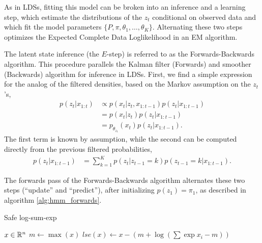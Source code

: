 \documentclass{article}
\begin{document}
As in LDSs, fitting this model can be broken into an inference and a learning
step, which estimate the distributions of the $z_{t}$ conditional on observed
data and which fit the model parameters $\{P, \pi, \theta_{1}, \dots,
\theta_{K}\}$. Alternating these two steps optimizes the Expected Complete Data
Loglikelihood in an EM algorithm.

The latent state inference (the $E$-step) is referred to as the
Forwards-Backwards algorithm. This procedure parallels the Kalman filter
(Forwards) and smoother (Backwards) algorithm for inference in LDSs. First,
we find a simple expression for the analog of the filtered densities, based on
the Markov assumption on the $z_{t}$'s,
\begin{align*}
  p\left(z_{t} \vert x_{1:t}\right) &\propto p\left(x_{t} \vert z_{t}, x_{1:t - 1}\right) p\left(z_{t} \vert x_{1:t - 1}\right) \\
  &= p\left(x_{t} \vert z_{t}\right) p\left(z_{t} \vert x_{1:t - 1}\right) \\
  &= p_{\theta_{z_{t}}}\left(x_{t}\right)p\left(z_{t} \vert x_{1:t - 1}\right).
\end{align*}
The first term is known by assumption, while the second can be computed directly
from the previous filtered probabilities,
\begin{align*}
  p\left(z_{t} \vert x_{1:t - 1}\right) &= \sum_{k = 1}^{K} p\left(z_{t} \vert z_{t - 1} = k\right)p\left(z_{t - 1} = k \vert x_{1:t - 1} \right).
\end{align*}

The forwards pass of the Forwards-Backwards algorithm alternates these two steps
(``update'' and ``predict''), after initializing $p\left(z_{1}\right) =
\pi_{1}$, as described in algorithm \ref{alg:hmm_forwards}.

\begin{algorithm}
   \caption{Safe log-sum-exp}
   \label{alg:normalize_log}
   \begin{algorithmic}
      $x \in \mathbb{R}^{n}$
     \STATE $m \leftarrow \max\left(x\right)$
      $lse\left(x\right) \leftarrow x - \left(m + \log\left(\sum\exp{x_{i} - m}\right)\right)$
   \end{algorithmic}
\end{algorithm}
\end{document}
